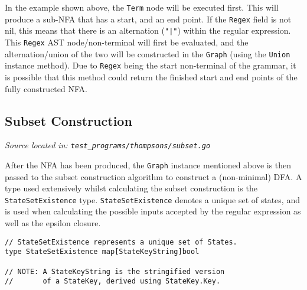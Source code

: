 In the example shown above, the \verb|Term| node will be executed first. This will produce a sub-NFA that has a start, and an end point. If the \verb|Regex| field is not nil, this means that there is an alternation (\verb+"|"+) within the regular expression. This \verb|Regex| AST node/non-terminal will first be evaluated, and the alternation/union of the two will be constructed in the \verb|Graph| (using the \verb|Union| instance method). Due to \verb|Regex| being the start non-terminal of the grammar, it is possible that this method could return the finished start and end points of the fully constructed NFA.

\subsection{Subset Construction}
\cprotect\textit{Source located in: \verb|test_programs/thompsons/subset.go|}

After the NFA has been produced, the \verb|Graph| instance mentioned above is then passed to the subset construction algorithm to construct a (non-minimal) DFA. A type used extensively whilst calculating the subset construction is the \verb|StateSetExistence| type. \verb|StateSetExistence| denotes a unique set of states, and is used when calculating the possible inputs accepted by the regular expression as well as the epsilon closure.






\begin{verbatim}
// StateSetExistence represents a unique set of States.
type StateSetExistence map[StateKeyString]bool

// NOTE: A StateKeyString is the stringified version 
//       of a StateKey, derived using StateKey.Key.
\end{verbatim}

